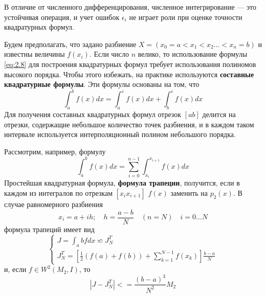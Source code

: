 В отличие от численного дифференцирования, численное интегрирование --- это устойчивая операция, и учет ошибок $\epsilon_i$ не играет роли при оценке точности квадратурных формул.

Будем предполагать, что задано разбиение $X=(x_0=a<x_1<x_2\dots<x_n=b)$ и известны величины $f(x_i)$. Если число $n$ велико, то использование формулы \ref{eq:2.8} для построения квадратурных формул требует использования полиномов высокого порядка. Чтобы этого избежать, на практике используются \textbf{составные квадратурные формулы}. Эти формулы основаны на том, что
\begin{equation}
	\int_{a}^{b} f(x)dx = \int_{a}^{c}f(x)dx + \int_{b}^{c}f(x)dx
\end{equation}
Для получения составных квадратурных формул  отрезок $[ab]$ делится на отрезки, содержащие небольшое количество точек разбиения, и в каждом таком интервале используется интерполяционный полином небольшого порядка.

Рассмотрим, например, формулу
\begin{equation}
	\int_{a}^{b} f(x)dx = \sum_{i=0}^{n-1}\int_{x_i}^{x_{i+1}}f(x)dx
\end{equation}
Простейшая квадратурная формула, \textbf{формула трапеции}, получится, если в каждом из интегралов по отрезкам $[x_ix_{i+1}]$ $f(x)$ заменить на $p_2(x)$. В случае равномерного разбиения
\begin{equation}
x_i = a + ih; \quad h = \frac{a-b}{N} \quad (n=N) \quad i=0 \dots N
\end{equation}
формула трапеций имеет вид
\begin{dmath}
	\begin{cases}
		J = \int_{a}{b}fdx \backsimeq J^T_N \\ 
		J^T_N = [\frac{1}{2}(f(a)+f(b)) + \sum_{k=1}^{N-1}f(x_k)]\frac{b-a}{N}
	\end{cases}
\end{dmath}
и, если $f \in W^2(M_2,I)$, то
\begin{equation}
	|J-J^T_N| <= \frac{(b-a)^3}{N^2}M_2
\end{equation}

